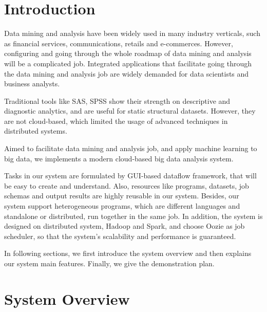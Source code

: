 \documentclass{sig-alternate-05-2015}
\begin{document}


%
%

%
%
\printccsdesc



\section{Introduction}
Data mining and analysis have been widely used in many industry verticals, such as financial services, communications, retails and e-commerces. However, configuring and going through the whole roadmap of data mining and analysis will be a complicated job. Integrated applications that facilitate going through the data mining and analysis job are widely demanded for data scientists and business analysts. 

Traditional tools like SAS, SPSS show their strength on descriptive and diagnostic analytics, and are useful for static structural datasets. However, they are not cloud-based, which limited the usage of advanced techniques in distributed systems. 

Aimed to facilitate data mining and analysis job, and apply machine learning to big data, we implements a modern cloud-based big data analysis system.

 Tasks in our system are formulated by GUI-based dataflow framework, that will be easy to create and understand. Also, resources like programs, datasets, job schemas and output results are highly reusable in our system. Besides, our system support heterogeneous programs, which are different languages and standalone or distributed, run together in the same job. In addition, the system is designed on distributed system, Hadoop and Spark, and choose Oozie as job scheduler, so that the system's scalability and performance is guaranteed.

In following sections, we first introduce the system overview and then explains our system main features. Finally, we give the demonstration plan.
\section{System Overview}
\end{document}
